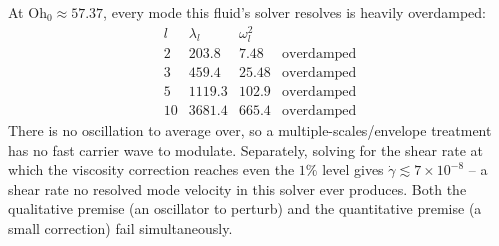 \begin{derivbox}
At $\mathrm{Oh}_0\approx 57.37$, every mode this fluid's solver resolves is
heavily overdamped:
\[
  \begin{array}{cccc}
    l & \lambda_l & \omega_l^2 & \\
    2 & 203.8 & 7.48 & \text{overdamped} \\
    3 & 459.4 & 25.48 & \text{overdamped} \\
    5 & 1119.3 & 102.9 & \text{overdamped} \\
    10 & 3681.4 & 665.4 & \text{overdamped}
  \end{array}
\]
There is no oscillation to average over, so a multiple-scales/envelope
treatment has no fast carrier wave to modulate. Separately, solving for the
shear rate at which the viscosity correction reaches even the $1\%$ level
gives $\dot\gamma\lesssim 7\times10^{-8}$ -- a shear rate no resolved mode
velocity in this solver ever produces. Both the qualitative premise (an
oscillator to perturb) and the quantitative premise (a small correction)
fail simultaneously.
\end{derivbox}

